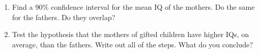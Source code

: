 \documentclass[10pt]{article}\usepackage[]{graphicx}\usepackage[]{color}
\newcommand{\Ex}{\mathbb{E}}
\begin{document}
\begin{enumerate}
  \itemsep1.5in
  \item Find a 90\% confidence interval for the mean IQ of the mothers. Do the same for the fathers. Do they overlap? 
  \item Test the hypothesis that the mothers of gifted children have higher IQs, on average, than the fathers. Write out all of the steps. What do you conclude?
\end{enumerate}
% 
% 
% 
% 
% 
% 
% 
% 
% 
% 
\end{document}
